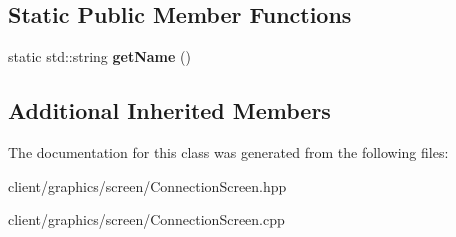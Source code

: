 \subsection*{Static Public Member Functions}
\begin{DoxyCompactItemize}
\item 
\hypertarget{classgraphics_1_1_connection_screen_acdb79f5a475a4e501ce442888946ea21}{static std\-::string {\bfseries get\-Name} ()}\label{classgraphics_1_1_connection_screen_acdb79f5a475a4e501ce442888946ea21}

\end{DoxyCompactItemize}
\subsection*{Additional Inherited Members}


The documentation for this class was generated from the following files\-:\begin{DoxyCompactItemize}
\item 
client/graphics/screen/Connection\-Screen.\-hpp\item 
client/graphics/screen/Connection\-Screen.\-cpp\end{DoxyCompactItemize}
